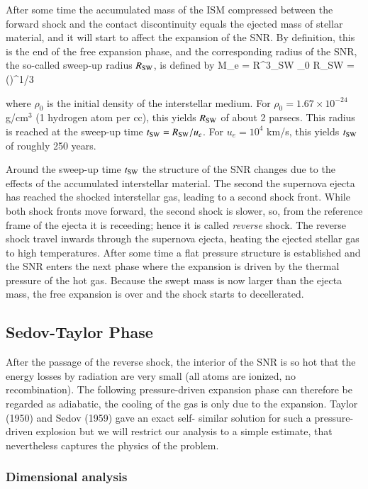 After some time the accumulated mass of the ISM compressed between the forward
shock and the contact discontinuity equals the ejected mass of stellar material, and it
will start to aﬀect the expansion of the SNR. By definition, this is the end of the free
expansion phase, and the corresponding radius of the SNR, the
so-called sweep-up radius $R_{\rm SW}$, is defined by
\beq
M_e =  R^3_{\rm SW} \rho_0 \quad \longrightarrow \quad
R_{\rm SW} = \left(\right)^{1/3}
\eeq

\noindent where $\rho_0$ is the initial density of the interstellar
medium. For $\rho_0=1.67\times 10^{-24}$ g/cm$^3$ (1 hydrogen atom per
cc), this yields $R_{\rm SW}$ of about 2 parsecs. This
radius is reached at the sweep-up time $t_{\rm SW} = R_{\rm
  SW}/u_e$. For $u_e=10^4$ km/s, this yields $t_{\rm SW}$ of roughly
250 years. 

Around the sweep-up time $t_{\rm SW}$ the structure of the SNR changes
due to the eﬀects of the accumulated interstellar material. The second
the supernova ejecta has reached the shocked interstellar gas, leading
to a second shock front. While both shock fronts move forward, the
second shock is slower, so, from the reference frame of the ejecta it
is receeding; hence it is called {\it reverse} shock. The
reverse shock travel inwards through the supernova ejecta, heating
the ejected stellar gas to high temperatures. After some time a flat pressure structure
is established and the SNR enters the next phase where the expansion is driven by the
thermal pressure of the hot gas. Because the swept mass is now larger
than the ejecta mass, the free expansion is over and the shock starts
to decellerated. 

\subsection{Sedov-Taylor Phase}

After the passage of the reverse shock, the interior of the SNR is so hot that the energy
losses by radiation are very small (all atoms are ionized, no recombination). The following
pressure-driven expansion phase can therefore be regarded as adiabatic, the cooling of the
gas is only due to the expansion. Taylor (1950) and Sedov (1959) gave an exact self-
similar solution for such a pressure-driven explosion but we will restrict our analysis to
a simple estimate, that nevertheless captures the physics of the
problem.

\subsubsection{Dimensional analysis}

